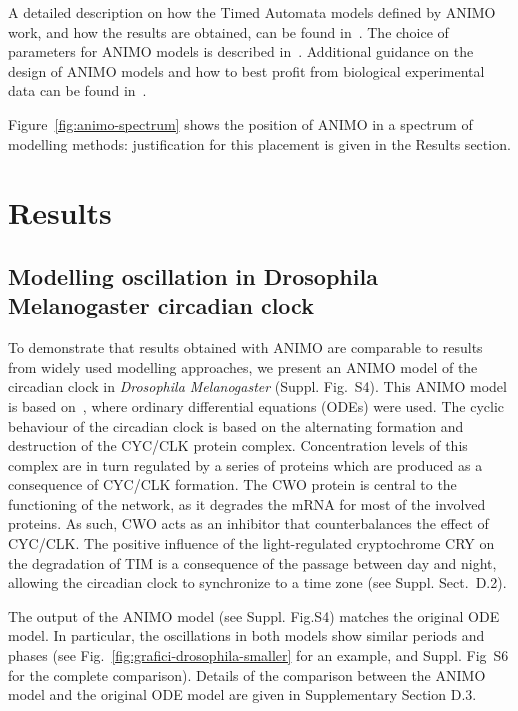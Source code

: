 \documentclass{bmcart}
\begin{document}
A detailed description on how the Timed Automata models defined by ANIMO work, and how the results are obtained,
can be found in~\cite{animo-ieee}. The choice of parameters for ANIMO models is described in~\cite{animo-syncop}.
Additional guidance on the design of ANIMO models and how to best profit from biological experimental data can be found in~\cite{animo-gene}.

Figure~\ref{fig:animo-spectrum} shows the position of ANIMO in a spectrum of modelling methods: justification for this placement is given in the Results section.






\section*{Results}\label{sec:results}
\subsection*{Modelling oscillation in Drosophila Melanogaster circadian clock}\label{sec:animo-drosophila}
To demonstrate that results obtained with ANIMO are comparable to results from widely used modelling
approaches, we present 
an ANIMO model of the circadian clock in \emph{Drosophila Melanogaster} (Suppl. Fig.~S4). %
This ANIMO model is based on~\cite{drosophila-ode-model},
where ordinary differential equations (ODEs) were used.
The cyclic behaviour of the circadian clock is based on the alternating formation and destruction of the
CYC/CLK protein complex.
Concentration levels of this complex are in turn regulated by a series of proteins which are produced as
a consequence of CYC/CLK formation. The CWO protein
is central to the functioning of the network, as it degrades the mRNA for most of the involved proteins.
As such, CWO acts as an inhibitor that counterbalances the effect of CYC/CLK.
The positive influence of the light-regulated cryptochrome CRY on the degradation of TIM is a consequence
of the passage between day and night, allowing
the circadian clock to synchronize to a time zone (see Suppl. Sect.~D.2). %


The output of the ANIMO model (see Suppl. Fig.S4) %
matches the original ODE model.
In particular, the oscillations in both models show similar periods and phases (see Fig.~\ref{fig:grafici-drosophila-smaller} for
an example, and Suppl. Fig~S6 %
for the complete comparison).
Details of the comparison
between the ANIMO model and the original ODE model are given in Supplementary Section D.3. %
\end{document}

